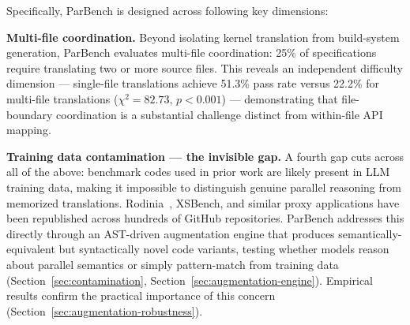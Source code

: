 \documentclass[conference]{IEEEtran}
\begin{document}

Specifically, ParBench is designed across following key dimensions:

\textbf{Multi-file coordination.} Beyond isolating kernel translation from build-system generation, ParBench evaluates multi-file coordination: 25\% of specifications require translating two or more source files. This reveals an independent difficulty dimension --- single-file translations achieve 51.3\% pass rate versus 22.2\% for multi-file translations ($\chi^2 = 82.73$, $p < 0.001$) --- demonstrating that file-boundary coordination is a substantial challenge distinct from within-file API mapping.

\textbf{Training data contamination --- the invisible gap.} A fourth gap cuts across all of the above: benchmark codes used in prior work are likely present in LLM training data, making it impossible to distinguish genuine parallel reasoning from memorized translations. Rodinia~\cite{Rodinia2009}, XSBench, and similar proxy applications have been republished across hundreds of GitHub repositories. ParBench addresses this directly through an AST-driven augmentation engine that produces semantically-equivalent but syntactically novel code variants, testing whether models reason about parallel semantics or simply pattern-match from training data (Section~\ref{sec:contamination}, Section~\ref{sec:augmentation-engine}). Empirical results confirm the practical importance of this concern (Section~\ref{sec:augmentation-robustness}).
\end{document}
